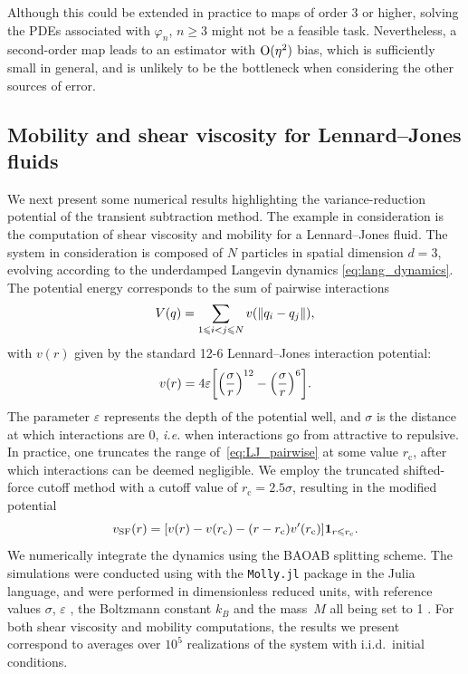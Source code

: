  Although this could be extended in practice to maps of order 3 or higher, solving the PDEs associated with $\varphi_n$, $n\geq 3$ might not be a feasible task. Nevertheless, a second-order map leads to an estimator with $\mathrm{O}(\eta^2)$ bias, which is sufficiently small in general, and is unlikely to be the bottleneck when considering the other sources of error.

\subsection{Mobility and shear viscosity for Lennard--Jones fluids}
\label{subsec:num_LJ}
%
We next present some numerical results highlighting the variance-reduction potential of the transient subtraction method. The example in consideration is the computation of shear viscosity and mobility for a Lennard--Jones fluid. The system in consideration is composed of $N$ particles in spatial dimension $d=3$, evolving according to the underdamped Langevin dynamics \eqref{eq:lang_dynamics}. The potential energy corresponds to the sum of pairwise interactions
%
\begin{equation}
	V(q) = \sum_{1\leqslant i<j\leqslant N} v(\lVert q_i - q_j\rVert),
\end{equation}
%
with $v(r)$ given by the standard 12-6 Lennard--Jones interaction potential:
%
\begin{equation}
	v(r) = 4\eps\bkt*{\paren*{\frac{\sigma}{r}}^{12} - \paren*{\frac{\sigma}{r}}^6}.
	\label{eq:LJ_pairwise}
\end{equation}
%
The parameter $\varepsilon$ represents the depth of the potential well, and $\sigma$ is the distance at which interactions are 0, \emph{i.e.} when interactions go from attractive to repulsive. In practice, one truncates the range of~\eqref{eq:LJ_pairwise} at some value $r_\mathrm{c}$, after which interactions can be deemed negligible. We employ the truncated shifted-force cutoff method with a cutoff value of $r_\mathrm{c}=2.5\sigma$, resulting in the modified potential
%
\begin{equation}
	v_\mathrm{SF}(r) = [v(r) - v(r_\mathrm{c}) - (r - r_\mathrm{c})v'(r_\mathrm{c})]\mathbf{1}_{r\leqslant r_\mathrm{c}}.
\end{equation}
%  
We numerically integrate the dynamics using the BAOAB splitting scheme. The simulations were conducted using with the \texttt{Molly.jl} package \cite{greener2024} in the Julia language, and were performed in dimensionless reduced units, with reference values $\sigma$, $\varepsilon$ , the Boltzmann constant $k_B$ and the mass~$M$ all being set to 1 . For both shear viscosity and mobility computations, the results we present correspond to averages over $10^5$ realizations of the system with i.i.d.\ initial conditions. 

